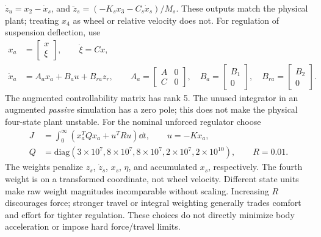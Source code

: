 $\dot z_u=x_2-\dot x_s$, and $\ddot z_s=(-K_sx_3-C_s\dot x_s)/M_s$.
These outputs match the physical plant; treating $x_4$ as wheel or relative velocity does not.
\newpage
{}
For regulation of suspension deflection, use
\begin{align}
 x_a&=\begin{bmatrix}x\\\xi\end{bmatrix},\qquad\dot\xi=Cx,\\
 \dot x_a&=A_ax_a+B_au+B_{ra}z_r,\qquad
 A_a=\begin{bmatrix}A&0\\C&0\end{bmatrix},\quad
 B_a=\begin{bmatrix}B_1\\0\end{bmatrix},\quad B_{ra}=\begin{bmatrix}B_2\\0\end{bmatrix}.
\end{align}
The augmented controllability matrix has rank 5. The unused integrator in an
augmented \emph{passive} simulation has a zero pole; this does not make the physical
four-state plant unstable.
For the nominal unforced regulator choose
\begin{align}
 J&=\int_0^\infty(x_a^TQx_a+u^TRu)\dd t,\qquad u=-Kx_a,\\
 Q&=\mathrm{diag}(3\!\times\!10^7,8\!\times\!10^7,8\!\times\!10^7,
 2\!\times\!10^7,2\!\times\!10^{10}),\qquad R=0.01.
\end{align}
The weights penalize $z_s$, $\dot z_s$, $x_s$, $\eta$, and accumulated $x_s$,
respectively. The fourth weight is on a transformed coordinate, not wheel velocity.
Different state units make raw weight magnitudes incomparable without scaling.
Increasing $R$ discourages force; stronger travel or integral weighting generally
trades comfort and effort for tighter regulation. These choices do not directly
minimize body acceleration or impose hard force/travel limits.

